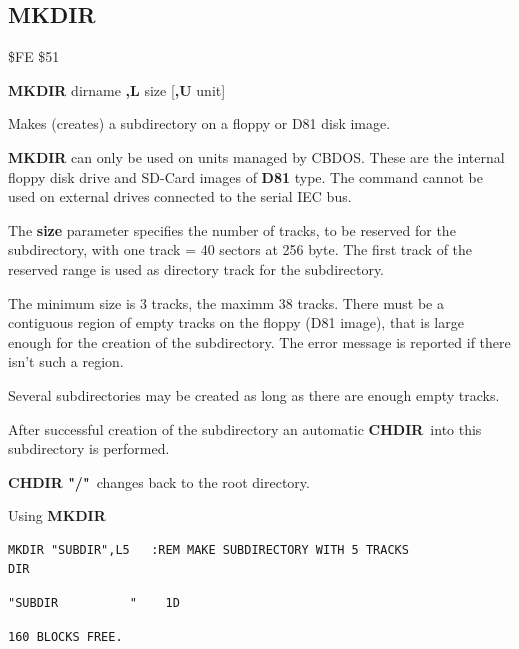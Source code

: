 \subsection{MKDIR}
\begin{description}[leftmargin=2cm,style=nextline]
\item [Token:] \$FE \$51
\item [Format:] {\bf MKDIR} dirname {\bf,L} size [{\bf,U} unit]
\item [Usage:] Makes (creates) a subdirectory on a floppy or D81 disk image.

   \dirnamedefinition

   {\bf MKDIR} can only be used on units managed by CBDOS.
   These are the internal floppy disk drive and SD-Card images of {\bf D81} type.
   The command cannot be used on external drives connected
   to the serial IEC bus.

   The {\bf size} parameter specifies the number of tracks, to be reserved
   for the subdirectory, with one track = 40 sectors at 256 byte.
   The first track of the reserved range is used as directory track
   for the subdirectory.

   The minimum size is 3 tracks, the maximm 38 tracks.
   There must be a contiguous region of empty tracks on the floppy
   (D81 image), that is large enough for the creation of the subdirectory.
   The error message  is reported if there isn't such a region.

   Several subdirectories may be created as long as there are enough
   empty tracks.

   After successful creation of the subdirectory an automatic
   {\bf CHDIR} into this subdirectory is performed.

   {\bf CHDIR "/"} changes back to the root directory.

\item [Examples:] Using {\bf MKDIR}
\begin{tcolorbox}[colback=black,coltext=white]
\verbatimfont{\codefont}
\begin{verbatim}
MKDIR "SUBDIR",L5   :REM MAKE SUBDIRECTORY WITH 5 TRACKS
DIR
\end{verbatim}
\selectfont{\codefont 0}
\begin{tcolorbox}[colback=white,coltext=black,arc=0mm,boxrule=0mm,
       left*=0.5mm,right*=0mm,top=0mm,bottom=0mm,nobeforeafter,
       left skip=0.5mm,
       width=28mm,height=3mm,valign=center]
\begin{verbatim}
"SUBDIR          "    1D
\end{verbatim}
\end{tcolorbox}
\begin{verbatim}
160 BLOCKS FREE.

\end{verbatim}
\end{tcolorbox}
\end{description}

